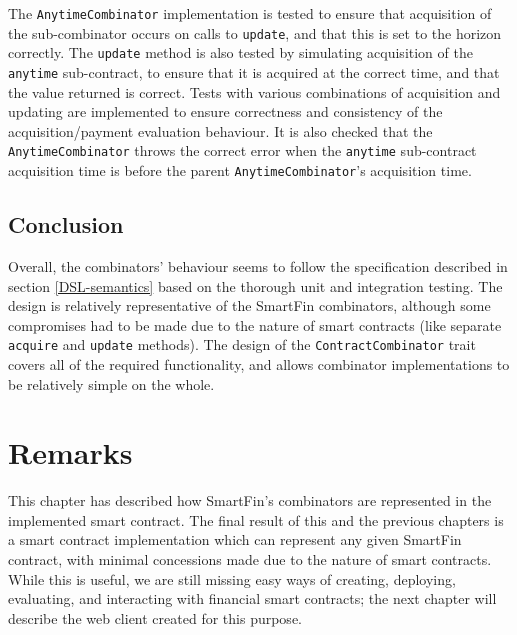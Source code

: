 The \texttt{AnytimeCombinator} implementation is tested to ensure that acquisition of the sub-combinator occurs on calls to \texttt{update}, and that this is set to the horizon correctly. The \texttt{update} method is also tested by simulating acquisition of the \texttt{anytime} sub-contract, to ensure that it is acquired at the correct time, and that the value returned is correct. Tests with various combinations of acquisition and updating are implemented to ensure correctness and consistency of the acquisition/payment evaluation behaviour. It is also checked that the \texttt{AnytimeCombinator} throws the correct error when the \texttt{anytime} sub-contract acquisition time is before the parent \texttt{AnytimeCombinator}'s acquisition time.


\subsection{Conclusion}

Overall, the combinators' behaviour seems to follow the specification described in section \ref{DSL-semantics} based on the thorough unit and integration testing. The design is relatively representative of the SmartFin combinators, although some compromises had to be made due to the nature of smart contracts (like separate \texttt{acquire} and \texttt{update} methods). The design of the \texttt{ContractCombinator} trait covers all of the required functionality, and allows combinator implementations to be relatively simple on the whole.


\section{Remarks}

This chapter has described how SmartFin's combinators are represented in the implemented smart contract. The final result of this and the previous chapters is a smart contract implementation which can represent any given SmartFin contract, with minimal concessions made due to the nature of smart contracts. \\

While this is useful, we are still missing easy ways of creating, deploying, evaluating, and interacting with financial smart contracts; the next chapter will describe the web client created for this purpose.

